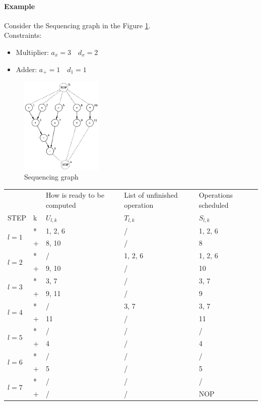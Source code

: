 \paragraph{Example}
Consider the Sequencing graph in the Figure \ref{fig:seqgraphEx}.\\
Constraints:
\begin{itemize}
\item Multiplier: $ a_x=3 \quad d_x=2 $
\item Adder: $ a_+=1 \quad d_1=1 $
\end{itemize}
\begin{figure}[H]
    \centering
    \includegraphics[width=0.35\textwidth]{./Cap4/Images/Image08.png}
    \caption{Sequencing  graph}
    \label{fig:seqgraphEx}
\end{figure}
\begin{center}
\begin{tabular}{l|l|l|l|l}
  \multicolumn{1}{l}{} & \multicolumn{1}{l}{} & \multicolumn{1}{l}{How is ready to be computed} & \multicolumn{1}{l}{List of unfinished operation} & \multicolumn{1}{l}{Operations scheduled} \\
  STEP & k & $ U_{l,k} $ & $ T_{l,k} $ & $ S_{l,k} $ \\
  \hline
  \multirow{2}{*}{$ l=1 $} 
  & * & 1, 2, 6 & / & 1, 2, 6 \\
  & + & 8, 10 & / & 8 \\
  \hline
  \multirow{2}{*}{$ l=2 $} 
  & * & / & 1, 2, 6 & 1, 2, 6 \\
  & + & 9, 10 & / & 10 \\
  \hline
  \multirow{2}{*}{$ l=3 $} 
  & * & 3, 7 & / & 3, 7 \\
  & + & 9, 11 & / & 9 \\
  \hline
  \multirow{2}{*}{$ l=4 $} 
  & * & / & 3, 7 & 3, 7 \\
  & + & 11 & / & 11 \\
  \hline
  \multirow{2}{*}{$ l=5 $} 
  & * & / & / & / \\
  & + & 4 & / & 4 \\
  \hline
  \multirow{2}{*}{$ l=6 $} 
  & * & / & / & / \\
  & + & 5 & / & 5 \\
  \hline
  \multirow{2}{*}{$ l=7 $} 
  & * & / & / & / \\
  & + & / & / & NOP \\
\end{tabular}
\end{center}
